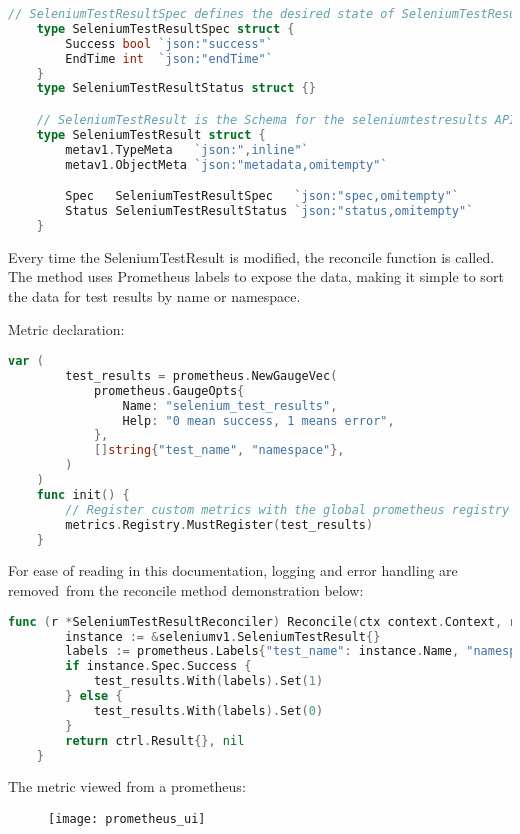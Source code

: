 \begin{lstlisting}[language={Go}]
	// SeleniumTestResultSpec defines the desired state of SeleniumTestResult
	type SeleniumTestResultSpec struct {
		Success bool `json:"success"`
		EndTime int  `json:"endTime"`
	}
	type SeleniumTestResultStatus struct {}

	// SeleniumTestResult is the Schema for the seleniumtestresults API
	type SeleniumTestResult struct {
		metav1.TypeMeta   `json:",inline"`
		metav1.ObjectMeta `json:"metadata,omitempty"`

		Spec   SeleniumTestResultSpec   `json:"spec,omitempty"`
		Status SeleniumTestResultStatus `json:"status,omitempty"`
	}
\end{lstlisting}

Every time the SeleniumTestResult is modified, the reconcile function is called. The method uses Prometheus labels to expose the data, making it simple to sort the data for test results by name or namespace.

Metric declaration:

\begin{lstlisting}[language={Go}]
	var (
		test_results = prometheus.NewGaugeVec(
			prometheus.GaugeOpts{
				Name: "selenium_test_results",
				Help: "0 mean success, 1 means error",
			},
			[]string{"test_name", "namespace"},
		)
	)
	func init() {
		// Register custom metrics with the global prometheus registry
		metrics.Registry.MustRegister(test_results)
	}
\end{lstlisting}

For ease of reading in this documentation, logging and error handling are removed from the reconcile method demonstration below:

\begin{lstlisting}[language={Go}]
	func (r *SeleniumTestResultReconciler) Reconcile(ctx context.Context, req ctrl.Request) (ctrl.Result, error) {
		instance := &seleniumv1.SeleniumTestResult{}
		labels := prometheus.Labels{"test_name": instance.Name, "namespace": instance.Namespace}
		if instance.Spec.Success {
			test_results.With(labels).Set(1)
		} else {
			test_results.With(labels).Set(0)
		}
		return ctrl.Result{}, nil
	}
\end{lstlisting}

The metric viewed from a prometheus:

\begin{figure}[H]
	\centering
	\texttt{[image: prometheus\_ui]}
	\label{fig:prometheus_ui}
\end{figure}




